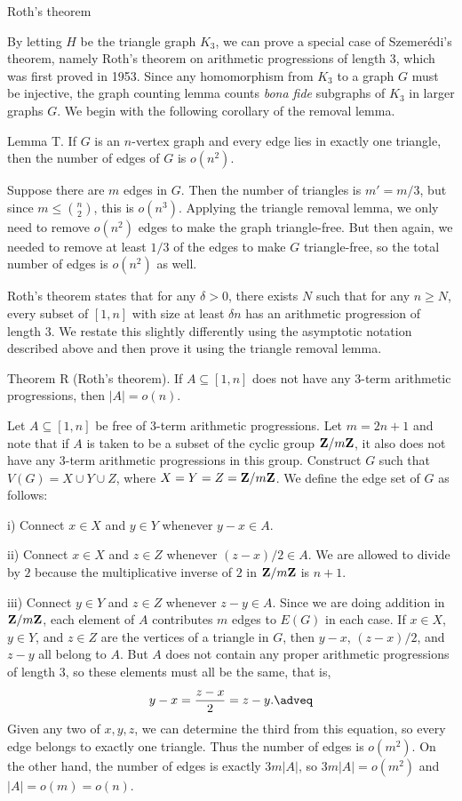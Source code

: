 \advsect Roth's theorem

By letting $H$ be the triangle graph $K_3$, we can prove a special case of Szemer\'edi's theorem, namely Roth's
theorem on arithmetic progressions of length $3$, which was first proved in 1953.
Since any homomorphism from $K_3$ to a graph $G$ must be injective, the graph counting
lemma counts {\it bona fide} subgraphs of $K_3$ in larger graphs $G$. We begin with the following corollary of
the removal lemma.

\proclaim Lemma T. If $G$ is an $n$-vertex graph and every edge lies in exactly one triangle, then the number
of edges of $G$ is $o(n^2)$.

\proof Suppose there are $m$ edges in $G$. Then the number of triangles is $m'=m/3$, but since $m\leq {n\choose 2}$,
this is $o(n^3)$. Applying the triangle removal lemma, we only need to remove $o(n^2)$ edges to make
the graph triangle-free. But then again, we needed to remove at least $1/3$ of the edges to make $G$ triangle-free,
so the total number of edges is $o(n^2)$ as well.\slug

Roth's theorem states that for any $\delta>0$, there exists $N$ such that for any $n\geq N$, every subset of $[1,n]$
with size at least $\delta n$ has an arithmetic progression of length $3$. We restate this slightly differently
using the asymptotic notation described above and then prove it using the triangle removal lemma.

\parenproclaim Theorem R (Roth's theorem).
If $A\subseteq [1,n]$ does not have any $3$-term arithmetic progressions, then $|A| = o(n)$.

\proof Let $A\subseteq [1,n]$ be free of $3$-term arithmetic progressions. Let $m=2n+1$ and note that if
$A$ is taken to be a subset of the cyclic group ${\bf Z}/m{\bf Z}$, it also does not have any $3$-term arithmetic
progressions in this group. Construct $G$ such that $V(G) = X \cup Y \cup Z$, where $X = Y = Z = {\bf Z}/m{\bf Z}$.
We define the edge set of $G$ as follows:
\medskip
\item{i)} Connect $x\in X$ and $y\in Y$ whenever $y-x\in A$.
\smallskip
\item{ii)} Connect $x\in X$ and $z\in Z$ whenever $(z-x)/2\in A$. We are allowed to divide by $2$ because the
multiplicative inverse of $2$ in ${\bf Z}/m{\bf Z}$ is $n+1$.
\smallskip
\item{iii)} Connect $y\in Y$ and $z\in Z$ whenever $z-y\in A$.
\medskip
Since we are doing addition in ${\bf Z}/m{\bf Z}$, each element of $A$ contributes $m$ edges to $E(G)$ in each case.
If $x\in X$, $y\in Y$, and $z\in Z$ are the vertices of a triangle in $G$, then $y-x$, $(z-x)/2$, and $z-y$ all
belong to $A$. But $A$ does not contain any proper arithmetic progressions of length $3$, so these elements
must all be the same, that is,
$$y-x = {z-x\over 2} = z-y.\adveq$$
Given any two of $x,y,z$, we can determine the third from this equation, so every edge belongs to exactly one
triangle. Thus the number of edges is $o(m^2)$. On the other hand, the number of edges is exactly $3m|A|$, so
$3m|A| = o(m^2)$ and $|A| = o(m) = o(n)$.\slug

